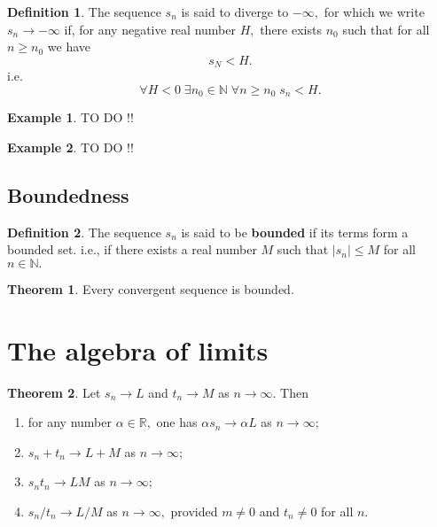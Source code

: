 \documentclass[12pt, a4paper]{article}
\newcommand{\bb}[1]{\mathbb{#1}}
\theoremstyle{definition}
\newtheorem{definition}{Definition}[section]
\newtheorem{theorem}{Theorem}[section]
\newtheorem*{example}{Example}
\theoremstyle{plain}
\begin{document}
\begin{definition}
The sequence $s_n$ is said to diverge to $-\infty,$ for which we write $s_n \to -\infty$ if, for any negative real number $H,$ there exists $n_0$ such that for all $n \geq n_0$ we have $$s_N<H.$$ i.e. 
$$\forall H<0 \; \exists n_0 \in \bb{N} \; \forall n\geq n_0 \; s_n<H.$$
\end{definition}

\begin{example}
TO DO !!
\end{example}

\begin{example}
TO DO !!
\end{example}

\subsection{Boundedness}

\begin{definition}
The sequence $s_n$ is said to be \textbf{bounded} if its terms form a bounded set. i.e., if there exists a real number $M$ such that $|s_n| \leq M$ for all $n \in \bb{N}.$
\end{definition}

\begin{theorem}
Every convergent sequence is bounded.
\end{theorem}

\section{The algebra of limits}

\begin{theorem}
Let $s_n \to L$ and $t_n \to M$ as $n\to \infty.$ Then 
\begin{enumerate}
 	
 	\item for any number $\alpha \in \bb{R},$ one has $\alpha s_n\to \alpha L$ as $n\to\infty;$

 	\item $s_n+t_n\to L+M$ as $n\to\infty;$

 	\item $s_nt_n\to LM$ as $n\to\infty;$

 	\item $s_n/t_n \to L/M$ as $n\to\infty,$ provided $m\neq 0$ and $t_n\neq 0$ for all $n.$
 
\end{enumerate} 
\end{theorem}
\end{document}
